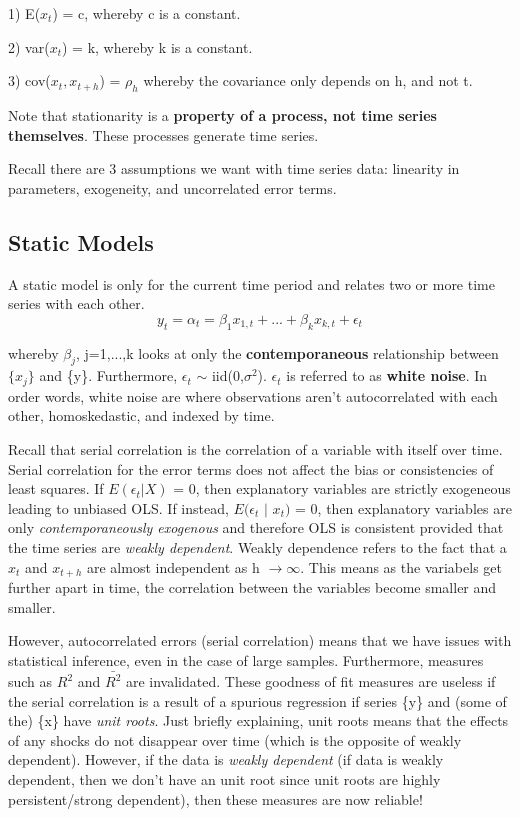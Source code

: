 \documentclass[11pt, oneside]{article}
\theoremstyle{definition}
\begin{document}
1) E($x_t$) = c, whereby c is a constant.

2) var($x_t$) = k, whereby k is a constant.

3) cov($x_t, x_{t+h}$) = $\rho_h$ whereby the covariance only depends on h, and not t.

Note that stationarity is a \textbf{property of a process, not time series themselves}. These processes generate time series.

 Recall there are 3 assumptions we want with time series data: linearity in parameters, exogeneity, and uncorrelated error terms.
\subsection{Static Models}
A static model is only for the current time period and relates two or more time series with each other.
$$
y_t = \alpha_t = \beta_1 x_{1,t} + ... + \beta_k x_{k,t} + \epsilon_t
$$

whereby $\beta_j$, j=1,...,k looks at only the \textbf{contemporaneous} relationship between $\{x_j\}$ and \{y\}. Furthermore, $\epsilon_t$ $\sim$ iid(0,$\sigma^2$). $\epsilon_t$ is referred to as \textbf{white noise}. In order words, white noise are where observations aren't autocorrelated with each other, homoskedastic, and indexed by time.

Recall that serial correlation is the correlation of a variable with itself over time. Serial correlation for the error terms does not affect the bias or consistencies of least squares. If $E(\epsilon_t | X)$ = 0, then explanatory variables are strictly exogeneous leading to unbiased OLS. If instead, $E(\epsilon_t$ $|$ $x_t)$ = 0, then explanatory variables are only \textit{contemporaneously exogenous} and therefore OLS is consistent provided that the time series are \textit{weakly dependent}. Weakly dependence refers to the fact that a $x_t$ and $x_{t+h}$ are almost independent as h $\rightarrow \infty$. This means as the variabels get further apart in time, the correlation between the variables become smaller and smaller.

However, autocorrelated errors (serial correlation) means that we have issues with statistical inference, even in the case of large samples. Furthermore, measures such as $R^2$ and $\bar{R^2}$ are invalidated. These goodness of fit measures are useless if the serial correlation is a result of a spurious regression if series \{y\} and (some of the) \{x\} have \textit{unit roots}. Just briefly explaining, unit roots means that the effects of any shocks do not disappear over time (which is the opposite of weakly dependent). However, if the data is \textit{weakly dependent} (if data is weakly dependent, then we don't have an unit root since unit roots are highly persistent/strong dependent), then these measures are now reliable!
\end{document}
